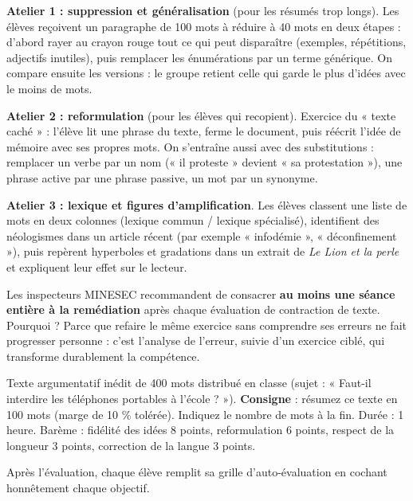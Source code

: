 \documentclass[11pt]{article}
\newcounter{popsec}
\newcounter{popsub}
\newcommand{\courssub}[1]{%
  \stepcounter{popsub}%
  \par\vspace{9pt}\noindent{\popxbold\fontsize{11.5}{13}\selectfont\color{popink}{\color{poporange}\thepopsec.\thepopsub}\hspace{6pt}#1}\par\nopagebreak\vspace{4pt}
}
\begin{document}
\textbf{Atelier 1 : suppression et généralisation} (pour les résumés trop longs). Les élèves reçoivent un paragraphe de 100 mots à réduire à 40 mots en deux étapes : d'abord rayer au crayon rouge tout ce qui peut disparaître (exemples, répétitions, adjectifs inutiles), puis remplacer les énumérations par un terme générique. On compare ensuite les versions : le groupe retient celle qui garde le plus d'idées avec le moins de mots.

\textbf{Atelier 2 : reformulation} (pour les élèves qui recopient). Exercice du « texte caché » : l'élève lit une phrase du texte, ferme le document, puis réécrit l'idée de mémoire avec ses propres mots. On s'entraîne aussi avec des substitutions : remplacer un verbe par un nom (« il proteste » devient « sa protestation »), une phrase active par une phrase passive, un mot par un synonyme.

\textbf{Atelier 3 : lexique et figures d'amplification}. Les élèves classent une liste de mots en deux colonnes (lexique commun / lexique spécialisé), identifient des néologismes dans un article récent (par exemple « infodémie », « déconfinement »), puis repèrent hyperboles et gradations dans un extrait de \emph{Le Lion et la perle} et expliquent leur effet sur le lecteur.

\begin{savaistu}
Les inspecteurs MINESEC recommandent de consacrer \textbf{au moins une séance entière à la remédiation} après chaque évaluation de contraction de texte. Pourquoi ? Parce que refaire le même exercice sans comprendre ses erreurs ne fait progresser personne : c'est l'analyse de l'erreur, suivie d'un exercice ciblé, qui transforme durablement la compétence.
\end{savaistu}

\courssub{Évaluation sommative et auto-évaluation}

\begin{exercice}
Texte argumentatif inédit de 400 mots distribué en classe (sujet : « Faut-il interdire les téléphones portables à l'école ? »). \textbf{Consigne} : résumez ce texte en 100 mots (marge de 10 \% tolérée). Indiquez le nombre de mots à la fin. Durée : 1 heure. Barème : fidélité des idées 8 points, reformulation 6 points, respect de la longueur 3 points, correction de la langue 3 points.
\end{exercice}

Après l'évaluation, chaque élève remplit sa grille d'auto-évaluation en cochant honnêtement chaque objectif.
\end{document}
